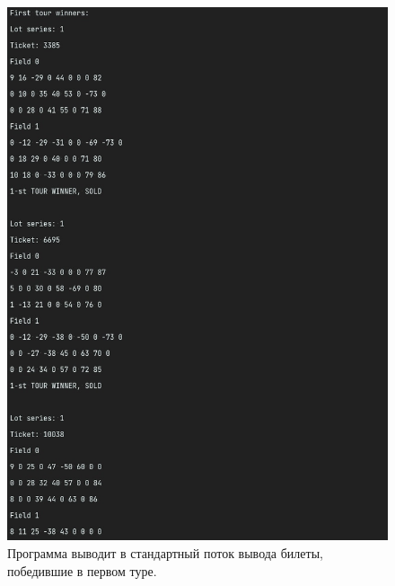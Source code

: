 \documentclass[a4paper,14pt]{article}
\begin{document}
\begin{figure}
  \centering
  \captionsetup{justification=centering,margin=1cm}
  \includegraphics[width=\linewidth]{pictures/2}
  \caption{Программа выводит в стандартный поток вывода билеты, победившие в первом туре.}
\end{figure}
\end{document}
